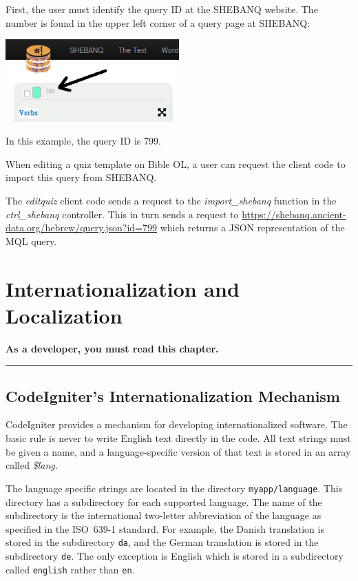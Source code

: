 \documentclass[11pt,oneside,a4paper]{memoir}
\begin{document}
First, the user must identify the query ID at the SHEBANQ website. The number is found in the
upper left corner of a query page at SHEBANQ:

\begin{center}
  \includegraphics[width=0.5\textwidth]{shebanq.png}
\end{center}

In this example, the query ID is 799.

When editing a quiz template on Bible OL, a user can request the client code to import this query
from SHEBANQ.

The \emph{editquiz} client code sends a request to the \emph{import\_shebanq} function in the
\emph{ctrl\_shebanq} controller. This in turn sends a request to
\url{https://shebanq.ancient-data.org/hebrew/query.json?id=799} which returns a JSON representation
of the MQL query.


\chapter{Internationalization and Localization}\label{chap-localize}

\textbf{As a developer, you must read this chapter.}

\plainbreak{3}

\section{CodeIgniter's Internationalization Mechanism}

CodeIgniter provides a mechanism for developing internationalized software. The basic rule is never
to write English text directly in the code. All text strings must be given a name, and a
language-specific version of that text is stored in an array called \emph{\$lang}.

The language specific strings are located in the directory \texttt{myapp/language}. This directory
has a subdirectory for each supported language. The name of the subdirectory is the international
two-letter abbreviation of the language as specified in the ISO~639-1 standard. For example, the
Danish translation is stored in the subdirectory \texttt{da}, and the German translation is stored
in the subdirectory \texttt{de}. The only exception is English which is stored in a subdirectory
called \texttt{english} rather than \texttt{en}.
\end{document}
